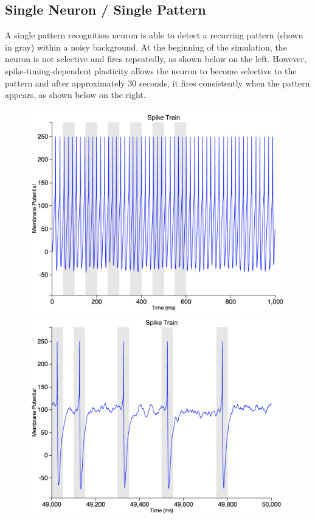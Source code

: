 \documentclass[a4paper,11pt]{article}
\begin{document}
\begin{appendices}
\subsection{Single Neuron / Single Pattern}
A single pattern recognition neuron is able to detect a recurring pattern (shown in gray) within a noisy background. At the beginning of the simulation, the neuron is not selective and fires repeatedly, as shown below on the left. However, spike-timing-dependent plasticity allows the neuron to become selective to the pattern and after approximately 30 seconds, it fires consistently when the pattern appears, as shown below on the right. \\

\begin{figure}[h]
\centering
\includegraphics[scale = 0.3]{single_pattern_beginning}
\includegraphics[scale = 0.3]{single_pattern_end} \\
\end{figure}


\end{appendices}
\end{document}
